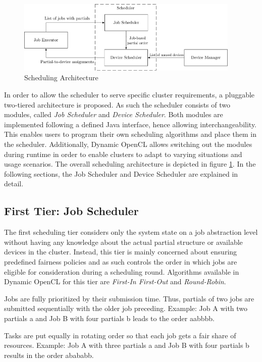 \begin{figure}[!htb]
	\includegraphics[width=0.95\textwidth]{drawings/scheduling_arch.pdf}
	\centering
	\caption{Scheduling Architecture}
	\label{img:scheduling_arch}
\end{figure}

In order to allow the scheduler to serve specific cluster requirements, a pluggable two-tiered architecture is proposed. As such the scheduler consists of two modules, called \textit{Job Scheduler} and \textit{Device Scheduler}. Both modules are implemented following a defined Java interface, hence allowing interchangeability. This enables users to program their own scheduling algorithms and place them in the scheduler. Additionally, Dynamic OpenCL allows switching out the modules during runtime in order to enable clusters to adapt to varying situations and usage scenarios. The overall scheduling architecture is depicted in figure \ref{img:scheduling_arch}. In the following sections, the Job Scheduler and Device Scheduler are explained in detail.

\subsection{First Tier: Job Scheduler}
The first scheduling tier considers only the system state on a job abstraction level without having any knowledge about the actual partial structure or available devices in the cluster. Instead, this tier is mainly concerned about ensuring predefined fairness policies and as such controls the order in which jobs are eligible for consideration during a scheduling round. Algorithms available in Dynamic OpenCL for this tier are \textit{First-In First-Out} and \textit{Round-Robin}.

\begin{description}[style=nextline]
	\item[First-In First-Out]
	Jobs are fully prioritized by their submission time. Thus, partials of two jobs are submitted sequentially with the older job preceding. Example: Job A with two partials a and Job B with four partials b leads to the order aabbbb.
	\item[Round-Robin]
	Tasks are put equally in rotating order so that each job gets a fair share of resources. Example: Job A with three partials a and Job B with four partials b results in the order abababb.
\end{description}

